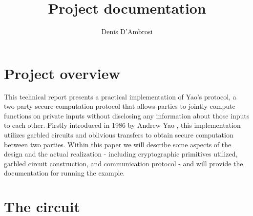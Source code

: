 \documentclass[12pt]{article}
\title{Project documentation}
\author{Denis D'Ambrosi}
\begin{document}
\maketitle

\section{Project overview}

This technical report presents a practical implementation of Yao's protocol, a two-party secure computation protocol that allows parties to jointly compute functions on private inputs without disclosing any information about those inputs to each other. Firstly introduced in 1986 by Andrew Yao \cite{YAO}, this implementation utilizes garbled circuits and oblivious transfers to obtain secure computation between two parties. Within this paper we will describe some aspects of the design and the actual realization - including cryptographic primitives utilized, garbled circuit construction, and communication protocol - and will provide the documentation for running the example.

\section{The circuit}
\end{document}

